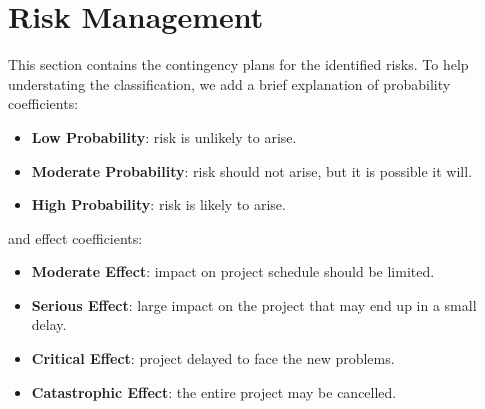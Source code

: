 \section{Risk Management}
This section contains the contingency plans for the identified risks. To help understating the classification, we add a brief explanation of probability coefficients:
\begin{itemize}
    \item \textbf{Low Probability}: risk is unlikely to arise.
    \item \textbf{Moderate Probability}: risk should not arise, but it is possible it will.
    \item \textbf{High Probability}: risk is likely to arise.
\end{itemize}
and effect coefficients:
\begin{itemize}
    \item \textbf{Moderate Effect}: impact on project schedule should be limited.
    \item \textbf{Serious Effect}: large impact on the project that may end up in a small delay.
    \item \textbf{Critical Effect}: project delayed to face the new problems.
    \item \textbf{Catastrophic Effect}: the entire project may be cancelled.
\end{itemize}


